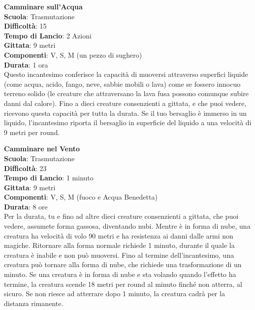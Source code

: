 \begin{multicols}{2}
\medskip\textbf{Camminare sull'Acqua}\\
\textbf{Scuola}: Trasmutazione\\
\textbf{Difficoltà}:  15\\
\textbf{Tempo di Lancio}: 2 Azioni\\
\textbf{Gittata}: 9 metri\\
\textbf{Componenti}: V, S, M (un pezzo di sughero)\\
\textbf{Durata}: 1 ora\\
Questo incantesimo conferisce la capacità di muoversi attraverso superfici liquide (come acqua, acido, fango, neve, sabbie mobili o lava) come se fossero innocuo terreno solido (le creature che attraversano la lava fusa possono comunque subire danni dal calore). Fino a dieci creature consenzienti a gittata, e che puoi vedere, ricevono questa capacità per tutta la durata. Se il tuo bersaglio è immerso in un liquido, l'incantesimo riporta il bersaglio in superficie del liquido a una velocità di 9 metri per round. 

\medskip\textbf{Camminare nel Vento}\\
\textbf{Scuola}: Trasmutazione\\
\textbf{Difficoltà}:  23\\
\textbf{Tempo di Lancio}: 1 minuto\\
\textbf{Gittata}: 9 metri\\
\textbf{Componenti}: V, S, M (fuoco e Acqua Benedetta)\\
\textbf{Durata}: 8 ore\\
Per la durata, tu e fino ad altre dieci creature consenzienti a gittata, che puoi vedere, assumete forma gassosa, diventando nubi. Mentre è in forma di nube, una creatura ha velocità di volo 90 metri e ha resistenza ai danni dalle armi non magiche. Ritornare alla forma normale richiede 1 minuto, durante il quale la creatura è inabile e non può muoversi. Fino al termine dell'incantesimo, una creatura può tornare alla forma di nube, che richiede una trasformazione di un minuto. Se una creatura è in forma di nube e sta volando quando l’effetto ha termine, la creatura scende 18 metri per round al minuto finché non atterra, al sicuro. Se non riesce ad atterrare dopo 1 minuto, la creatura cadrà per la distanza rimanente.


\end{multicols}
